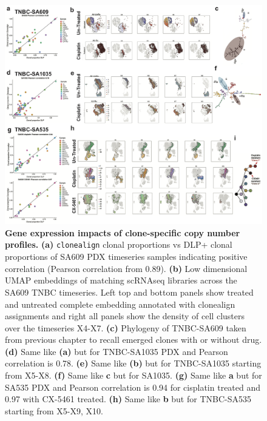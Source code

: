 \begin{figure}
\centering
\includegraphics[width=\textwidth]{Figures/chap5/fig2_clonealignembeddings.png}
	
\caption[Gene expression impacts of clone-specific copy number profiles]
	{\small
	\textbf{Gene expression impacts of clone-specific copy number profiles.}
	   \textbf{(a)} \texttt{clonealign} clonal proportions vs DLP+ clonal proportions of SA609 PDX timeseries samples indicating positive correlation (Pearson correlation from 0.89).
	    \textbf{(b)} Low dimensional \ac{UMAP} embeddings of matching scRNAseq libraries across the SA609 TNBC timeseries. Left top and bottom panels show treated and untreated complete embedding annotated with clonealign assignments and right all panels show the density of cell clusters over the timeseries X4-X7.
	     \textbf{(c)} Phylogeny of TNBC-SA609 taken from previous chapter to recall emerged clones with or without drug. 
	     \textbf{(d)} Same like \textbf{(a)} but for TNBC-SA1035 PDX and Pearson correlation is 0.78. \textbf{(e)} Same like \textbf{(b)} but for TNBC-SA1035 starting from X5-X8. \textbf{(f)} Same like \textbf{c} but for SA1035. \textbf{(g)} Same like \textbf{a} but for SA535 PDX and Pearson correlation is 0.94 for cisplatin treated and 0.97 with CX-5461 treated. \textbf{(h)} Same like \textbf{b} but for TNBC-SA535 starting from X5-X9, X10.
	}
	\label{fig:fig2_clonealignembeddings.pdf}
\end{figure}

